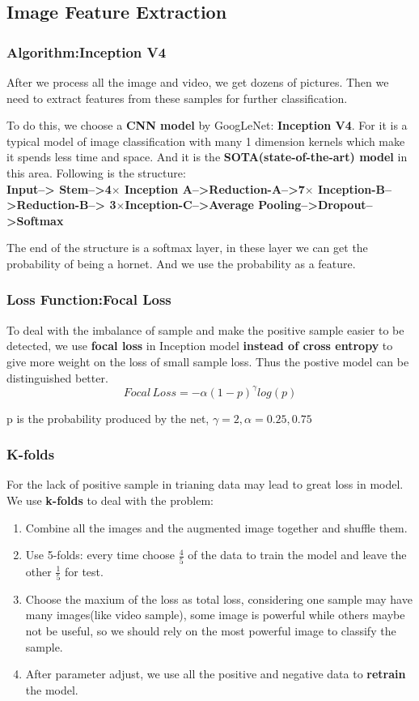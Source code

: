 \documentclass[12pt]{article}
\begin{document}
\subsection{Image Feature Extraction}
\subsubsection{Algorithm:Inception V4}
After we process all the image and video, we get dozens of pictures. Then we need to extract features from these samples for further classification.

To do this, we choose a \textbf{CNN model} by GoogLeNet: \textbf{Inception V4}. For it is a typical model of image classification with many 1 dimension kernels which make it spends less time and space. And it is the \textbf{SOTA(state-of-the-art) model} in this area.
Following is the structure:\\
\textbf{Input--> Stem-->4$\times$ Inception A-->Reduction-A-->7$\times$ Inception-B-->Reduction-B--> 3$\times$Inception-C-->Average Pooling-->Dropout-->Softmax}

The end of the structure is a softmax layer, in these layer we can get the probability of being a hornet. And we use the probability as a feature.


\subsubsection{Loss Function:Focal Loss}
To deal with the imbalance of sample and make the positive sample easier to be detected, we use \textbf{focal loss} in Inception model \textbf{instead of cross entropy} to give more weight on the loss of small sample loss. Thus the postive model can be distinguished better.	
\begin{equation}
Focal\,Loss=-\alpha(1-p)^\gamma log(p)
\end{equation} 
\begin{center}
	p is the probability produced by the net, $\gamma=2,\alpha=0.25,0.75$
\end{center}

\subsubsection{K-folds}
For the lack of positive sample in trianing data may lead to great loss in model. We use \textbf{k-folds} to deal with the problem:
\begin{enumerate}
	\item Combine all the images and the augmented image together and shuffle them.
	\item Use 5-folds: every time choose $\frac{4}{5}$ of the data to train the model and leave the other $\frac{1}{5}$ for test.
	\item Choose the maxium of the loss as total loss, considering one sample may have many images(like video sample), some image is powerful while others maybe not be useful, so we should rely on the most powerful image to classify the sample.
	\item After parameter adjust, we use all the positive and negative data to\textbf{ retrain} the model.
\end{enumerate}
\end{document}
